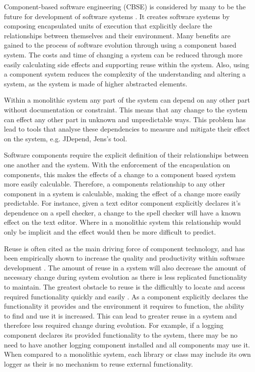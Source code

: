Component-based software engineering (CBSE) is considered by many to be the future for development of software systems \cite{Szyperski2002}.
It creates software systems by composing encapsulated units of execution that explicitly declare the relationships between themselves and their environment.
Many benefits are gained to the process of software evolution through using a component based system. 
The costs and time of changing a system can be reduced through more easily calculating side effects and supporting reuse within the system.
Also, using a component system reduces the complexity of the understanding and altering a system, as the system is made of higher abstracted elements. 

Within a monolithic system any part of the system can depend on any other part without documentation or constraint.
This means that any change to the system can effect any other part in unknown and unpredictable ways.
This problem has lead to tools that analyse these dependencies to measure and mitigate their effect on the system, e.g. JDepend, Jens's tool.

Software components require the explicit definition of their relationships between one another and the system. 
With the enforcement of the encapsulation on components, this makes the effects of a change to a component based system more easily calculable.
Therefore, a components relationship to any other component in a system is calculable, making the effect of a change more easily predictable.
For instance, given a text editor component explicitly declares it's dependence on a spell checker, a change to the spell checker will have a known effect on the text editor.
Where in a monolithic system this relationship would only be implicit and the effect would then be more difficult to predict.

Reuse is often cited as the main driving force of component technology, and has been empirically shown to increase the quality and productivity within software development \cite{hallsteinsen_experiences_1997}.
The amount of reuse in a system will also decrease the amount of necessary change during system evolution as there is less replicated functionality to maintain.
The greatest obstacle to reuse is the difficultly to locate and access required functionality quickly and easily \cite{ye_supporting_2001}.
As a component explicitly declares the functionality it provides and the environment it requires to function, the ability to find and use it is increased.
This can lead to greater reuse in a system and therefore less required change during evolution.
For example, if a logging component declares its provided functionality to the system, there may be no need to have another logging component installed and all components may use it.
When compared to a monolithic system, each library or class may include its own logger as their is no mechanism to reuse external functionality.

